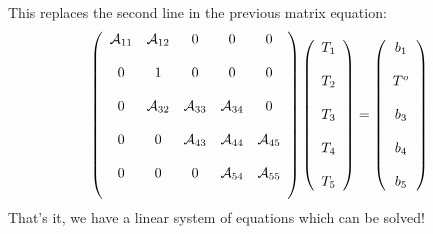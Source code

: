 This replaces the second line in the previous matrix equation:
\[
\left(
\begin{array}{ccccc}
{\cal A}_{11} & {\cal A}_{12} & 0& 0& 0\\ \\
0 & 1 & 0 & 0 & 0 \\ \\
0 & {\cal A}_{32} & {\cal A}_{33}&  {\cal A}_{34} & 0 \\\\
0&0&   {\cal A}_{43} & {\cal A}_{44}&  {\cal A}_{45} \\\\
0&0&0   & {\cal A}_{54}&  {\cal A}_{55} \\\\
\end{array}
\right)
\left(
\begin{array}{c}
T_1 \\\\ T_2 \\\\ T_3 \\\\ T_4 \\\\ T_5
\end{array}
\right)
=
\left(
\begin{array}{c}
b_{1} \\ \\
T^{o} \\ \\
b_{3}\\\\
b_{4}\\\\
b_{5}
\end{array}
\right)
\]
That's it, we have a linear system of equations which can be solved!






